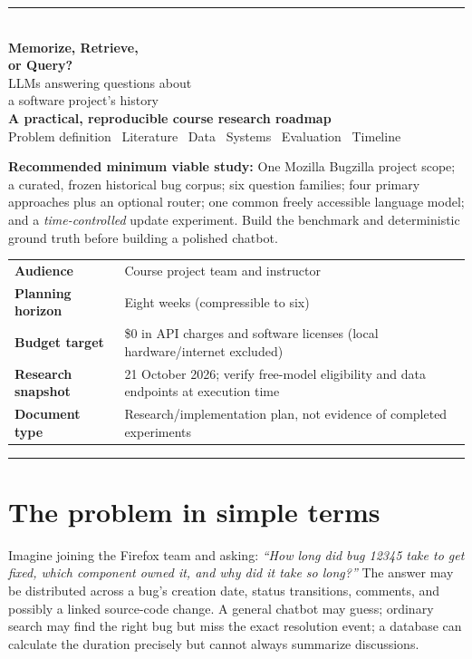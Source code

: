 \documentclass[11pt,a4paper]{article}
\begin{document}
\begin{titlepage}
\vspace*{1.1cm}
{\color{teal}\rule{\linewidth}{2.5pt}}\\[0.65cm]
{\Huge\bfseries\color{navy}Memorize, Retrieve,\\[0.12cm]or Query?}\\[0.36cm]
{\LARGE\color{muted}LLMs answering questions about\\a software project's history}\\[0.8cm]
{\Large\bfseries A practical, reproducible course research roadmap}\\[0.25cm]
{\normalsize Problem definition \textbullet\ Literature \textbullet\ Data \textbullet\ Systems \textbullet\ Evaluation \textbullet\ Timeline}
\vfill
\begin{keybox}
\textbf{Recommended minimum viable study:} One Mozilla Bugzilla project scope; a curated, frozen historical bug corpus; six question families; four primary approaches plus an optional router; one common freely accessible language model; and a \emph{time-controlled} update experiment. Build the benchmark and deterministic ground truth before building a polished chatbot.
\end{keybox}
\vspace{0.5cm}
\begin{tabularx}{\linewidth}{@{}lX@{}}
\textbf{Audience} & Course project team and instructor \\
\textbf{Planning horizon} & Eight weeks (compressible to six) \\
\textbf{Budget target} & \$0 in API charges and software licenses (local hardware/internet excluded) \\
\textbf{Research snapshot} & 21 October 2026; verify free-model eligibility and data endpoints at execution time \\
\textbf{Document type} & Research/implementation plan, not evidence of completed experiments \\
\end{tabularx}
\vspace{0.5cm}
{\color{teal}\rule{\linewidth}{1pt}}
\end{titlepage}
\setcounter{tocdepth}{1}\tableofcontents\clearpage

\section{The problem in simple terms}
Imagine joining the Firefox team and asking: \emph{``How long did bug 12345 take to get fixed, which component owned it, and why did it take so long?''} The answer may be distributed across a bug's creation date, status transitions, comments, and possibly a linked source-code change. A general chatbot may guess; ordinary search may find the right bug but miss the exact resolution event; a database can calculate the duration precisely but cannot always summarize discussions.
\end{document}
